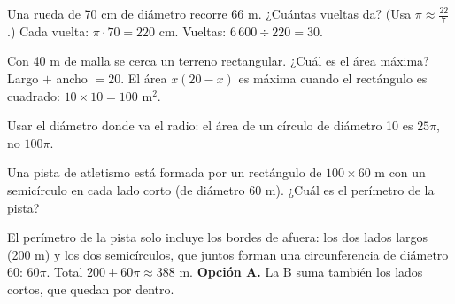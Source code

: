 \begin{ejemplo}
Una rueda de 70 cm de diámetro recorre 66 m. ¿Cuántas vueltas da? (Usa $\pi \approx \tfrac{22}{7}$.)
\solucion Cada vuelta: $\pi \cdot 70 = 220$ cm. Vueltas: $6\,600 \div 220 = 30$.
\end{ejemplo}

\begin{ejemplo}
Con 40 m de malla se cerca un terreno rectangular. ¿Cuál es el área máxima?
\solucion Largo $+$ ancho $= 20$. El área $x(20 - x)$ es máxima cuando el rectángulo es cuadrado: $10 \times 10 = 100$ m$^2$.
\end{ejemplo}

\begin{trampa}
Usar el diámetro donde va el radio: el área de un círculo de diámetro 10 es $25\pi$, no $100\pi$.
\end{trampa}

\begin{reto}
Una pista de atletismo está formada por un rectángulo de $100 \times 60$ m con un semicírculo en cada lado corto (de
diámetro 60 m). ¿Cuál es el perímetro de la pista?
\end{reto}

\begin{retoresuelto}
El perímetro de la pista solo incluye los bordes de afuera: los dos lados largos (200 m) y los dos semicírculos, que
juntos forman una circunferencia de diámetro 60: $60\pi$. Total $200 + 60\pi \approx 388$ m. \textbf{Opción A.} La B
suma también los lados cortos, que quedan por dentro.
\end{retoresuelto}

